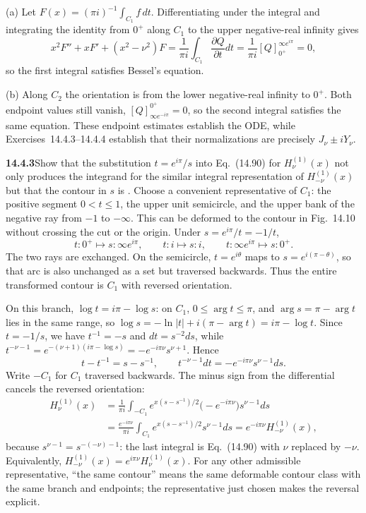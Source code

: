 (a) Let $F(x)=(\pi i)^{-1}\int_{C_1}f\,dt$. Differentiating under
the integral and integrating the identity from $0^+$ along $C_1$
to the upper negative-real infinity gives
\[
x^2F''+xF'+(x^2-\nu^2)F=\frac1{\pi i}\int_{C_1}
\frac{\partial Q}{\partial t}dt
=\frac1{\pi i}[Q]_{0^+}^{\infty e^{i\pi}}=0,
\]
so the first integral satisfies Bessel's equation.

(b) Along $C_2$ the orientation is from the lower negative-real
infinity to $0^+$. Both endpoint values still vanish,
$[Q]_{\infty e^{-i\pi}}^{0^+}=0$, so the second integral satisfies
the same equation. These endpoint estimates
establish the ODE, while Exercises~14.4.3--14.4.4 establish that
their normalizations are precisely $J_\nu\pm iY_\nu$.

\par\bigskip
\noindent\textbf{14.4.3}\quad Show that the substitution $t=e^{i\pi}/s$
into Eq.~(14.90) for $H_{\nu}^{(1)}(x)$ not only produces the integrand
for the similar integral representation of $H_{-\nu}^{(1)}(x)$ but that
the contour in $s$ is .
\solution
Choose a convenient representative of $C_1$: the positive segment
$0<t\le1$, the upper unit semicircle, and the upper bank of the
negative ray from $-1$ to $-\infty$. This can be deformed to the
contour in Fig.~14.10 without crossing the cut or the origin.
Under $s=e^{i\pi}/t=-1/t$,
\[
t:0^+\longmapsto s:\infty e^{i\pi},\qquad
t:i\longmapsto s:i,\qquad
t:\infty e^{i\pi}\longmapsto s:0^+.
\]
The two rays are exchanged. On the semicircle, $t=e^{i\theta}$
maps to $s=e^{i(\pi-\theta)}$, so that arc is also unchanged as
a set but traversed backwards. Thus the entire transformed
contour is $C_1$ with reversed orientation.

On this branch, $\log t=i\pi-\log s$: on $C_1$, $0\le\arg t\le\pi$,
and $\arg s=\pi-\arg t$ lies in the same range, so
$\log s=-\ln|t|+i(\pi-\arg t)=i\pi-\log t$. Since $t=-1/s$, we have
$t^{-1}=-s$ and $dt=s^{-2}ds$, while
$t^{-\nu-1}=e^{-(\nu+1)(i\pi-\log s)}=-e^{-i\pi\nu}s^{\nu+1}$.
Hence
\[
t-t^{-1}=s-s^{-1},\qquad
t^{-\nu-1}dt=-e^{-i\pi\nu}s^{\nu-1}ds.
\]
Write $-C_1$ for $C_1$ traversed backwards. The minus sign from the
differential cancels the reversed orientation:
\begin{align*}
H_\nu^{(1)}(x)
&=\frac1{\pi i}\int_{-C_1}e^{x(s-s^{-1})/2}
\bigl(-e^{-i\pi\nu}\bigr)s^{\nu-1}ds\\
&=\frac{e^{-i\pi\nu}}{\pi i}\int_{C_1}
e^{x(s-s^{-1})/2}s^{\nu-1}ds
=\boxed{e^{-i\pi\nu}H_{-\nu}^{(1)}(x)},
\end{align*}
because $s^{\nu-1}=s^{-(-\nu)-1}$: the last integral is
Eq.~(14.90) with $\nu$ replaced by $-\nu$. Equivalently,
$H_{-\nu}^{(1)}(x)=e^{i\pi\nu}H_\nu^{(1)}(x)$.
For any other admissible representative, ``the same contour'' means
the same deformable contour class with the same branch and endpoints;
the representative just chosen makes the reversal explicit.

